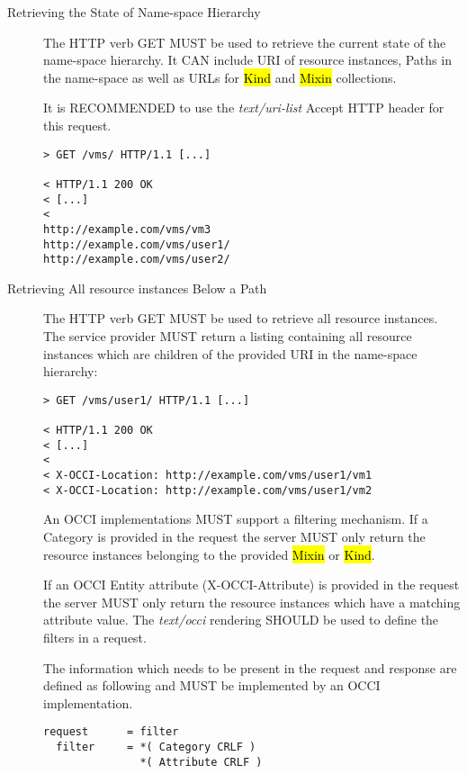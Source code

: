 \documentclass[10pt,a4paper]{article}
\begin{document}
\begin{description}

   \item[Retrieving the State of Name-space Hierarchy] The HTTP verb
     GET MUST be used to retrieve the current state of the name-space
     hierarchy. It CAN include URI of resource instances, Paths in the
     name-space as well as URLs for \hl{Kind} and \hl{Mixin}
     collections.

   It is RECOMMENDED to use the \emph{text/uri-list} Accept HTTP
   header for this request.

\begin{verbatim}
> GET /vms/ HTTP/1.1 [...]
 
< HTTP/1.1 200 OK
< [...]
< 
http://example.com/vms/vm3
http://example.com/vms/user1/
http://example.com/vms/user2/
\end{verbatim}

  \item[Retrieving All resource instances Below a Path] The HTTP verb
    GET MUST be used to retrieve all resource instances. The service
    provider MUST return a listing containing all resource instances
    which are children of the provided URI in the name-space
    hierarchy:

\begin{verbatim}
> GET /vms/user1/ HTTP/1.1 [...]
 
< HTTP/1.1 200 OK
< [...]
< 
< X-OCCI-Location: http://example.com/vms/user1/vm1
< X-OCCI-Location: http://example.com/vms/user1/vm2
\end{verbatim}

    An OCCI implementations MUST support a filtering mechanism. If a
    Category is provided in the request the server MUST only return
    the resource instances belonging to the provided \hl{Mixin} or
    \hl{Kind}.

    If an OCCI Entity attribute (X-OCCI-Attribute) is provided in the
    request the server MUST only return the resource instances which
    have a matching attribute value. The \emph{text/occi} rendering
    SHOULD be used to define the filters in a request.

    The information which needs to be present in the request and
    response are defined as following and MUST be implemented by an
    OCCI implementation.

\begin{verbatim}
request      = filter
  filter     = *( Category CRLF )
               *( Attribute CRLF )


\end{verbatim}
\end{description}
\end{document}
